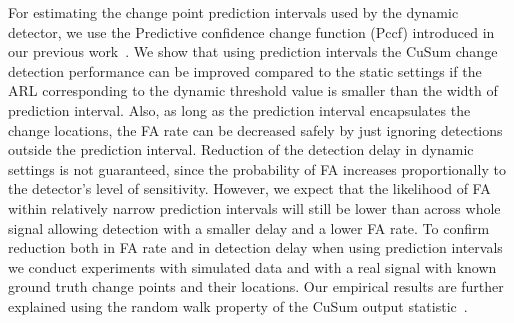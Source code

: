 For estimating the change point prediction intervals used by the dynamic detector, we use the Predictive confidence change function (Pccf) introduced in our previous work~\cite{MaslovSDM2016}. 
We show that using prediction intervals the CuSum change detection performance can be improved compared to the static settings if the ARL corresponding to the dynamic threshold value is smaller than the width of prediction interval.
Also, as long as the prediction interval encapsulates the change locations, the FA rate can be decreased safely by just ignoring detections outside the prediction interval.
Reduction of the detection delay in dynamic settings is not guaranteed, since the probability of FA increases proportionally to the detector's level of sensitivity.
However, we expect that the likelihood of FA within relatively narrow prediction intervals will still be lower than across whole signal allowing detection with a smaller delay and a lower FA rate.
%
To confirm reduction both in FA rate and in detection delay when using prediction intervals we conduct experiments with simulated data and with a real signal with known ground truth change points and their locations. 
Our empirical results are further explained using the random walk property of the 
CuSum output statistic~\cite{billingsley2013convergence, basseville1993detection,veeravalli2014quickest}.

